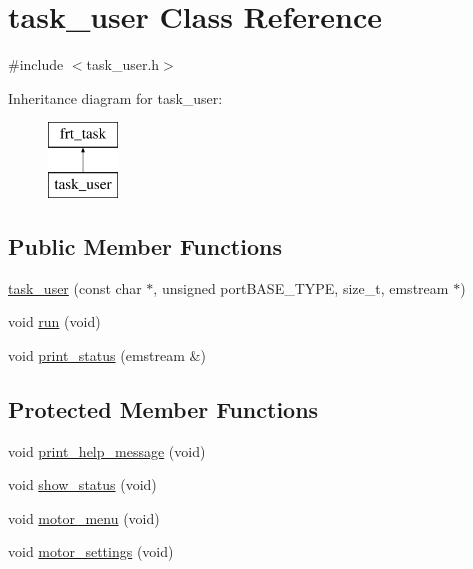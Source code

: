\hypertarget{classtask__user}{\section{task\+\_\+user Class Reference}
\label{classtask__user}
}


{\ttfamily \#include $<$task\+\_\+user.\+h$>$}

Inheritance diagram for task\+\_\+user\+:\begin{figure}[H]
\begin{center}
\leavevmode
\includegraphics[height=2.000000cm]{classtask__user}
\end{center}
\end{figure}
\subsection*{Public Member Functions}
\begin{DoxyCompactItemize}
\item 
\hyperlink{classtask__user_a3aba77563b375bb14838800608da48bc}{task\+\_\+user} (const char $\ast$, unsigned port\+B\+A\+S\+E\+\_\+\+T\+Y\+P\+E, size\+\_\+t, emstream $\ast$)
\item 
void \hyperlink{classtask__user_adca6429d57be25e8d411414fc8ad75af}{run} (void)
\item 
void \hyperlink{classtask__user_a78170e5ebe8dca1ce0a5a09c507399f1}{print\+\_\+status} (emstream \&)
\end{DoxyCompactItemize}
\subsection*{Protected Member Functions}
\begin{DoxyCompactItemize}
\item 
void \hyperlink{classtask__user_a75475060f83bae1e44bcc8a5c34015c7}{print\+\_\+help\+\_\+message} (void)
\item 
void \hyperlink{classtask__user_a105bebbd9cb1031154c3dfc3662db4a0}{show\+\_\+status} (void)
\item 
void \hyperlink{classtask__user_a62e9a23d2a052ef1c34ef4c6f1152032}{motor\+\_\+menu} (void)
\item 
void \hyperlink{classtask__user_aab1a6f3f0ea7acce28c845a0cf992e6d}{motor\+\_\+settings} (void)
\end{DoxyCompactItemize}
